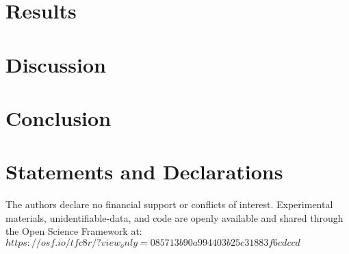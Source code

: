 \documentclass[sn-apa]{sn-jnl}%
\theoremstyle{thmstyleone}%
\theoremstyle{thmstyletwo}%
\theoremstyle{thmstylethree}%
\begin{document}
\section{Results}\label{sec3}


\section{Discussion}\label{sec4}


\section{Conclusion}\label{sec5}


\section*{Statements and Declarations}

The authors declare no financial support or conflicts of interest. Experimental materials, unidentifiable-data, and code are openly available and shared through the Open Science Framework at: $https://osf.io/tfc8r/?view_only=085713b90a994403b25c31883f6cdccd $

\noindent



\end{document}
